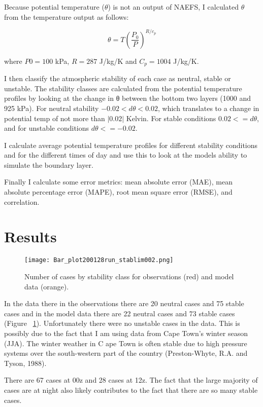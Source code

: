 \documentclass[12pt]{article}
\begin{document}
Because potential temperature ($\theta$) is not an output of NAEFS, I calculated $\theta$ 
from the temperature output as follows: 

\bigskip

\begin{equation}
    \theta=T\left(\frac{P_{0}}{P}\right)^{R / c_{p}}
    \end{equation}
\bigskip

where $P0=100$ kPa, $R=287$ J/kg/K and $C_p=1004$  J/kg/K.

I then classify the atmospheric stability of each case as neutral, stable or unstable. 
The stability classes are calculated from the potential temperature profiles by looking 
at the change in θ between the bottom two layers (1000 and 925 kPa). For neutral stability 
$-0.02 < dθ < 0.02$, which translates to a change in potential temp of not more than 
$|0.02|$ Kelvin. For stable conditions $0.02 <= dθ$, and for unstable conditions $dθ <= -0.02$. 

I calculate average potential temperature profiles for different stability conditions 
and for the different times of day and use this to look at the models ability to simulate 
the boundary layer. 

Finally I calculate some error metrics: mean absolute error (MAE), mean absolute percentage 
error (MAPE), root mean square error (RMSE), and correlation. 


\section{Results}

\begin{figure}[h]
    \centering
    \texttt{[image: Bar\_plot200128run\_stablim002.png]}
    \caption{Number of cases by stability class for observations (red) and model data (orange).}
    \label{fig:bar}
\end{figure}


In the data there in the observations there are 20 neutral cases and 75 stable cases 
and in the model data there are 22 neutral cases and 73 stable cases (Figure ~\ref{fig:bar}). 
Unfortunately there were no unstable cases in the data. This is possibly due to the 
fact that I am using data from Cape Town’s winter season (JJA). The winter weather in C
ape Town is often stable due to high pressure systems over the south-western part of the 
country (Preston-Whyte, R.A. and Tyson, 1988). 

There are 67 cases at 00z and 28 cases at 12z. The fact that the large majority of cases are at night also 
likely contributes to the fact that there are so many stable cases.
\end{document}
